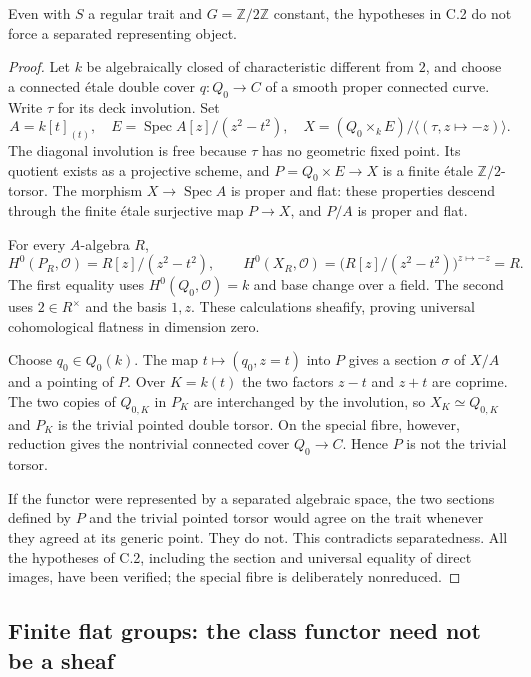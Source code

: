\begin{proposition}
\label{C:etale-nonseparated}
Even with $S$ a regular trait and $G=\mathbb Z/2\mathbb Z$ constant,
the hypotheses in C.2 do not force a separated representing object.
\end{proposition}

\begin{proof}
Let $k$ be algebraically closed of characteristic different from $2$,
and choose a connected \'etale double cover $q\colon Q_0\to C$ of a
smooth proper connected curve.  Write $\tau$ for its deck involution.
Set
\[
A=k[t]_{(t)},\quad
E=\operatorname{Spec}A[z]/(z^2-t^2),\quad
X=(Q_0\times_k E)/\langle(\tau,z\mapsto-z)\rangle.
\]
The diagonal involution is free because $\tau$ has no geometric fixed
point.  Its quotient exists as a projective scheme, and
$P=Q_0\times E\to X$ is a finite \'etale $\mathbb Z/2$-torsor.
The morphism $X\to\operatorname{Spec}A$ is proper and flat: these
properties descend through the finite \'etale surjective map $P\to X$,
and $P/A$ is proper and flat.

For every $A$-algebra $R$,
\[
H^0(P_R,\mathcal O)=R[z]/(z^2-t^2),\qquad
H^0(X_R,\mathcal O)
=\bigl(R[z]/(z^2-t^2)\bigr)^{z\mapsto-z}=R.
\]
The first equality uses $H^0(Q_0,\mathcal O)=k$ and base change over
a field.  The second uses $2\in R^\times$ and the basis $1,z$.
These calculations sheafify, proving universal cohomological
flatness in dimension zero.

Choose $q_0\in Q_0(k)$.  The map $t\mapsto(q_0,z=t)$ into $P$ gives
a section $\sigma$ of $X/A$ and a pointing of $P$.  Over
$K=k(t)$ the two factors $z-t$ and $z+t$ are coprime.  The two copies
of $Q_{0,K}$ in $P_K$ are interchanged by the involution, so
$X_K\simeq Q_{0,K}$ and $P_K$ is the trivial pointed double torsor.
On the special fibre, however, reduction gives the nontrivial
connected cover $Q_0\to C$.  Hence $P$ is not the trivial torsor.

If the functor were represented by a separated algebraic space, the
two sections defined by $P$ and the trivial pointed torsor would agree
on the trait whenever they agreed at its generic point.  They do not.
This contradicts separatedness.  All the hypotheses of C.2, including
the section and universal equality of direct images, have been
verified; the special fibre is deliberately nonreduced.
\end{proof}

\subsection{Finite flat groups: the class functor need not be a sheaf}


